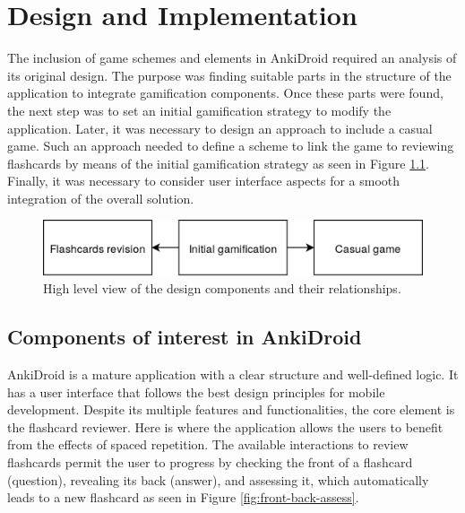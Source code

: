 
\chapter{Design and Implementation} %

\label{desi} %

The inclusion of game schemes and elements in AnkiDroid required an analysis of its original design. The purpose was finding suitable parts in the structure of the application to integrate gamification components. Once these parts were found, the next step was to set an initial gamification strategy to modify the application. Later, it was necessary to design an approach to include a casual game. Such an approach needed to define a scheme to link the game to reviewing flashcards by means of the initial gamification strategy as seen in Figure \ref{fig:game-elem-cards}. Finally, it was necessary to consider user interface aspects for a smooth integration of the overall solution.

\begin{figure}[htb]
    \vskip 5mm
        \begin{center}
            \includegraphics[scale=0.3]{./Figures/design.png}
            \caption{High level view of the design components and their relationships.}
            \label{fig:game-elem-cards}
        \end{center}
    \vskip -5mm
\end{figure}


\section{Components of interest in AnkiDroid}
\label{desi-components-interest}
AnkiDroid is a mature application with a clear structure and well-defined logic. It has a user interface that follows the best design principles for mobile development. Despite its multiple features and functionalities, the core element is the flashcard reviewer. Here is where the application allows the users to benefit from the effects of spaced repetition. The available interactions to review flashcards permit the user to progress by checking the front of a flashcard (question), revealing its back (answer), and assessing it, which automatically leads to a new flashcard as seen in Figure \ref{fig:front-back-assess}.


